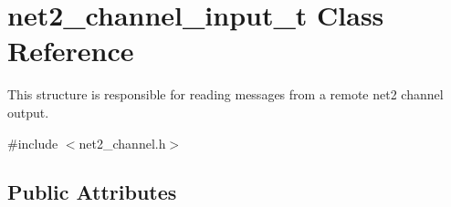 \hypertarget{structnet2__channel__input__t}{\section{net2\-\_\-channel\-\_\-input\-\_\-t Class Reference}
\label{structnet2__channel__input__t}
}


This structure is responsible for reading messages from a remote net2 channel output.  




{\ttfamily \#include $<$net2\-\_\-channel.\-h$>$}

\subsection*{Public Attributes}
